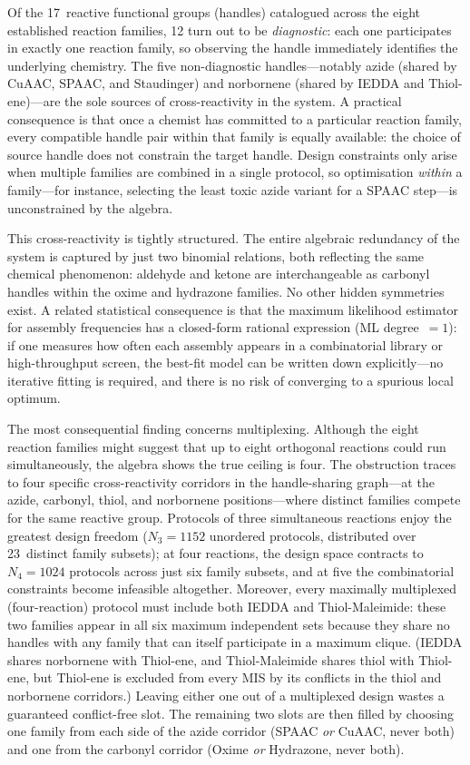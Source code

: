 \documentclass[preprint,12pt]{elsarticle}
\theoremstyle{definition}
\theoremstyle{remark}
\begin{document}
Of the 17~reactive functional groups (handles) catalogued across the
eight established reaction families, 12 turn out to be
\emph{diagnostic}: each one participates in exactly one reaction
family, so observing the handle immediately identifies the underlying
chemistry.  The five non-diagnostic handles---notably azide (shared by
CuAAC, SPAAC, and Staudinger) and norbornene (shared by IEDDA and
Thiol-ene)---are the sole sources of cross-reactivity in the system.
A practical consequence is that once a chemist has committed to a
particular reaction family, every compatible handle pair within that
family is equally available: the choice of source handle does not
constrain the target handle.  Design constraints only arise when
multiple families are combined in a single protocol, so optimisation
\emph{within} a family---for instance, selecting the least toxic
azide variant for a SPAAC step---is unconstrained by the algebra.

This cross-reactivity is tightly structured.  The entire algebraic
redundancy of the system is captured by just two binomial relations,
both reflecting the same chemical phenomenon: aldehyde and ketone
are interchangeable as carbonyl handles within the oxime and
hydrazone families.  No other hidden symmetries exist.
A related statistical consequence is that the maximum likelihood
estimator for assembly frequencies has a closed-form rational
expression (ML degree~$= 1$): if one measures how often each
assembly appears in a combinatorial library or high-throughput screen,
the best-fit model can be written down explicitly---no iterative
fitting is required, and there is no risk of converging to a
spurious local optimum.

The most consequential finding concerns multiplexing.  Although the
eight reaction families might suggest that up to eight orthogonal
reactions could run simultaneously, the algebra shows the true
ceiling is four.  The obstruction traces to four specific
cross-reactivity corridors in the handle-sharing graph---at the
azide, carbonyl, thiol, and norbornene positions---where distinct
families compete for the same reactive group.  Protocols of three simultaneous reactions enjoy the greatest
design freedom ($N_3 = 1152$ unordered protocols, distributed
over 23~distinct family subsets); at four reactions, the design
space contracts to $N_4 = 1024$ protocols across just six family
subsets, and at five the combinatorial constraints become
infeasible altogether.
Moreover, every maximally multiplexed (four-reaction) protocol must
include both IEDDA and Thiol-Maleimide: these two families appear in
all six maximum independent sets because they share no handles with
any family that can itself participate in a maximum clique.  (IEDDA
shares norbornene with Thiol-ene, and Thiol-Maleimide shares thiol
with Thiol-ene, but Thiol-ene is excluded from every MIS by its
conflicts in the thiol and norbornene corridors.)  Leaving either
one out of a multiplexed design wastes a guaranteed conflict-free
slot.  The remaining two
slots are then filled by choosing one family from each side of the
azide corridor (SPAAC \emph{or} CuAAC, never both) and one from the
carbonyl corridor (Oxime \emph{or} Hydrazone, never both).
\end{document}
